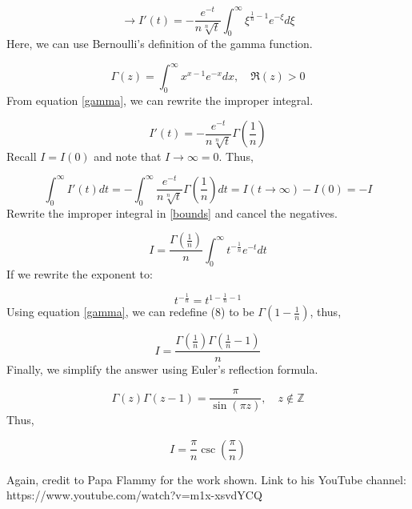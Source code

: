 \documentclass[12pt]{article}
\begin{document}
\begin{equation}
    \to I'(t) = - \frac{e^{-t}}{n\sqrt[n]{t}} \int_{0}^{\infty} \xi^{\frac{1}{n}-1}e^{-\xi} d\xi
\end{equation}
Here, we can use Bernoulli's definition of the gamma function.

\begin{equation} \label{gamma}
    \Gamma (z) = \int_{0}^{\infty} x^{x-1}e^{-x} dx,\quad \mathfrak{R}(z) > 0
\end{equation}
From equation \eqref{gamma}, we can rewrite the improper integral.

\begin{equation}
    I'(t) = - \frac{e^{-t}}{n\sqrt[n]{t}} \Gamma \left (\frac{1}{n}\right )
\end{equation}
Recall \(I=I(0)\) and note that \(I \to \infty = 0\). Thus,

\begin{equation} \label{bounds}
    \int_{0}^{\infty} I'(t) dt = - \int_{0}^{\infty} \frac{e^{-t}}{n\sqrt[n]{t}} \Gamma \left (\frac{1}{n}\right ) dt = I(t \to\infty) - I(0) = -I
\end{equation}
Rewrite the improper integral in \eqref{bounds} and cancel the negatives.

\begin{equation}
    I = \frac{\Gamma (\frac{1}{n})}{n} \int_{0}^{\infty} t^{-\frac{1}{n}} e^{-t} dt
\end{equation}
If we rewrite the exponent to: 

\begin{equation}
    t^{-\frac{1}{n}} = t^{1-\frac{1}{n}-1}
\end{equation}
Using equation \eqref{gamma}, we can redefine (8) to be \(\Gamma (1 - \frac{1}{n})\), thus,

\begin{equation}
    I = \frac{\Gamma (\frac{1}{n})\Gamma (\frac{1}{n}-1)}{n}
\end{equation}
Finally, we simplify the answer using Euler's reflection formula.

\begin{equation}
    \Gamma (z)\Gamma (z-1) = \frac{\pi}{\sin (\pi z)}, \quad z \not\in \mathbb{Z}
\end{equation}
Thus,

\begin{equation}
    I = \frac{\pi}{n} \csc\left (\frac{\pi}{n}\right )
\end{equation}

Again, credit to Papa Flammy for the work shown. Link to his YouTube channel: https://www.youtube.com/watch?v=m1x-xsvdYCQ
\end{document}
